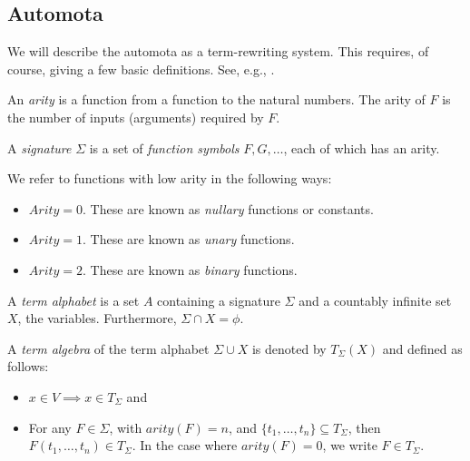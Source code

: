 \subsection{Automota} %
\label{sub:automota}
We will describe the automota as a term-rewriting system. This requires, of course, giving a few
basic definitions. See, e.g., \cite{termrewriting2003}.
\begin{definition}\label{def:arity}
  An \emph{arity} is a function from a function to the natural numbers. The arity of $F$ is the
  number of inputs (arguments) required by $F$.
\end{definition} 
\begin{definition}\label{def:signature}
  A \emph{signature} $\Sigma$ is a set of \emph{function symbols} $F,G,\ldots$, each of which has
  an arity.
\end{definition}

\begin{remark}
  We refer to functions with low arity in the following ways:
  \begin{itemize}
    \item $Arity = 0$.  These are known as \emph{nullary} functions or constants.
    \item $Arity = 1$.  These are known as \emph{unary} functions.
    \item $Arity = 2$.  These are known as \emph{binary} functions.
  \end{itemize}
\end{remark}

\begin{definition}\label{def:term_alphabet}
  A \emph{term alphabet} is a set $A$ containing a signature $\Sigma$ and a countably infinite set
  $X$, the variables. Furthermore, $\Sigma \cap X = \phi$.
\end{definition}

\begin{definition}\label{def:term_algebra}
  A \emph{term algebra} of the term alphabet $\Sigma \cup X$ is denoted by $T_\Sigma(X)$ and
  defined as follows:
  \begin{itemize}
    \item $x\in V \implies x \in T_\Sigma$ and
    \item For any $F\in\Sigma$, with $arity(F) = n$, and $\{t_1,\ldots,t_n\} \subseteq T_\Sigma$,
    then $F(t_1,\ldots,t_n)\in T_\Sigma$. In the case where $arity(F) = 0$, we write 
    $F \in T_\Sigma$.
  \end{itemize}
\end{definition}

